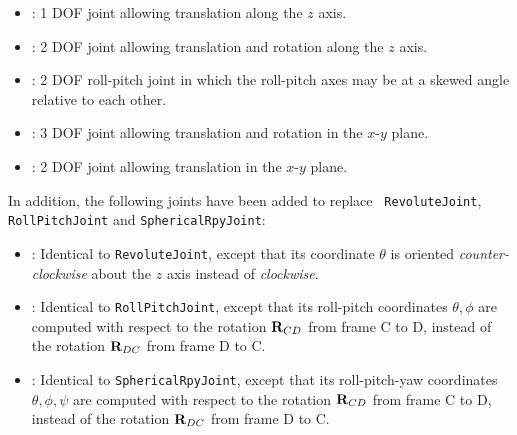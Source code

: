\documentclass{article}
\def\R{{\bf R}}
\begin{document}
\begin{itemize}

\item
{}:
1 DOF joint allowing translation along the
$z$ axis.

\item
{}:
2 DOF joint allowing translation and
rotation along the $z$ axis.

\item
{}: 
2 DOF roll-pitch joint in which the roll-pitch axes may be at a
skewed angle relative to each other.

\item
{}:
3 DOF joint allowing translation and
rotation in the $x$-$y$ plane.

\item
{}: 
2 DOF joint allowing translation
in the $x$-$y$ plane.

\end{itemize}

In addition, the following joints have been added to replace {\tt
RevoluteJoint}, {\tt RollPitchJoint} and {\tt SphericalRpyJoint}:

\begin{itemize}

\item {}: Identical to
{\tt RevoluteJoint}, except that its coordinate $\theta$ is oriented
{\it counter-clockwise} about the $z$ axis instead of {\it clockwise}.

\item
{}:
Identical to {\tt RollPitchJoint}, except
that its roll-pitch coordinates $\theta, \phi$ are computed with
respect to the rotation $\R_{CD}$ from frame C to D, instead of the
rotation $\R_{DC}$ from frame D to C.

\item {}:
Identical to {\tt SphericalRpyJoint}, except that its roll-pitch-yaw
coordinates $\theta, \phi, \psi$ are computed with respect to the
rotation $\R_{CD}$ from frame C to D, instead of the rotation
$\R_{DC}$ from frame D to C.

\end{itemize}
\end{document}
